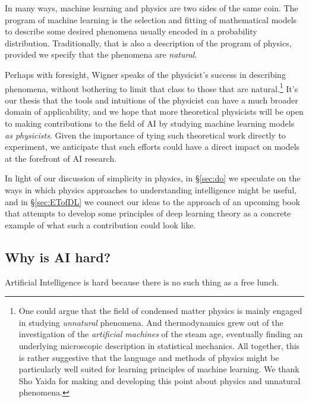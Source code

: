 \documentclass[12pt]{article}
\begin{document}
 
In many ways, machine learning and physics are two sides of the same coin.
The program of machine learning is the selection and fitting of mathematical models to describe some desired phenomena usually encoded in a probability distribution.  Traditionally, that is also a description of the program of physics, provided we specify that the phenomena are \emph{natural}.  

Perhaps with foresight, Wigner speaks of the physicist's success in describing phenomena, without bothering to limit that class to those that are natural.\footnote{
    One could argue that the field of condensed matter physics is mainly engaged in studying \emph{unnatural} phenomena. And thermodynamics grew out of the investigation of the \emph{artificial machines} of the steam age, eventually finding an underlying microscopic description in statistical mechanics. 
    All together, this is rather suggestive that the language and methods of physics might be particularly well suited for learning principles of machine learning. 
    We thank Sho Yaida for making and developing this point about physics and unnatural phenomena.
}  
It's our thesis that the tools and intuitions of the physicist can have a much broader domain of applicability, and 
we hope that more theoretical physicists will be open to making contributions to the field of AI by studying machine learning models \emph{as physicists}. Given the importance of tying such theoretical work directly to experiment, we anticipate that such efforts could have a direct impact on models at the forefront of AI research. 


In light of our discussion of simplicity in physics, 
in \S\ref{sec:do} we 
speculate on the ways in which 
physics 
approaches to understanding
intelligence 
might be useful, and  in \S\ref{sec:ETofDL} we connect our ideas to the approach of an upcoming book \cite{Principles} that attempts to %
develop some principles of 
deep learning 
theory 
as a concrete  
example of what such a contribution could look like.







\subsection{Why is AI hard?}\label{sec:ai-hard}


\noindent{}Artificial Intelligence is hard because there is no such thing as a free lunch. 
\end{document}
